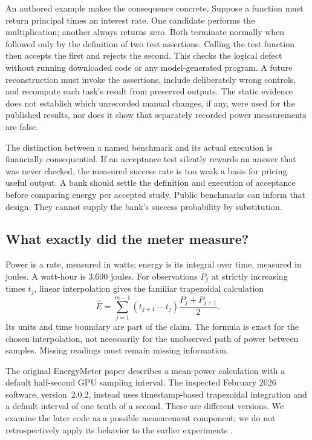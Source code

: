 An authored example makes the consequence concrete. Suppose a function must
return principal times an interest rate. One candidate performs the
multiplication; another always returns zero. Both terminate normally when
followed only by the definition of two test assertions. Calling the test
function then accepts the first and rejects the second. This checks the
logical defect without running downloaded code or any model-generated
program. A future reconstruction must invoke the assertions, include
deliberately wrong controls, and recompute each task's result from preserved
outputs. The static evidence does not establish which unrecorded manual
changes, if any, were used for the published results, nor does it show that
separately recorded power measurements are false.

The distinction between a named benchmark and its actual execution is
financially consequential. If an acceptance test silently rewards an answer
that was never checked, the measured success rate is too weak a basis for
pricing useful output. A bank should settle the definition and execution of
acceptance before comparing energy per accepted study. Public benchmarks
can inform that design. They cannot supply the bank's success probability
by substitution.

\subsection{What exactly did the meter measure?}

Power is a rate, measured in watts; energy is its integral over time,
measured in joules. A watt-hour is 3,600 joules. For observations $P_j$ at
strictly increasing times $t_j$, linear interpolation gives the familiar
trapezoidal calculation
\begin{equation}
 \widehat E=\sum_{j=1}^{m-1}
        (t_{j+1}-t_j)\frac{P_j+P_{j+1}}2.
 \label{closure:energy-trapezoid}
\end{equation}
Its units and time boundary are part of the claim. The formula is exact for
the chosen interpolation, not necessarily for the unobserved path of power
between samples. Missing readings must remain missing information.

The original EnergyMeter paper describes a mean-power calculation with a
default half-second GPU sampling interval. The inspected February 2026
software, version~2.0.2, instead uses timestamp-based trapezoidal integration
and a default interval of one tenth of a second. These are different
versions. We examine the later code as a possible measurement component;
we do not retrospectively apply its behavior to the earlier experiments
\citep{closureEnergyMeter2026}.

